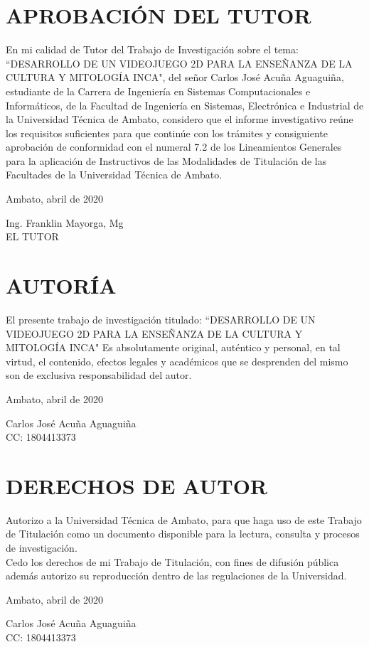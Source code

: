 \documentclass[a4paper, openright, 12pt]{report}
\begin{document}
\setcounter{page}{2}
\newpage
\chapter*{APROBACIÓN DEL TUTOR}
En mi calidad de Tutor del Trabajo de Investigación sobre el tema: ``DESARROLLO DE UN VIDEOJUEGO 2D PARA LA ENSEÑANZA DE LA CULTURA Y MITOLOGÍA INCA", del señor Carlos José Acuña Aguaguiña, estudiante de la Carrera de Ingeniería en Sistemas Computacionales e Informáticos, de la Facultad de Ingeniería en Sistemas, Electrónica e Industrial de la Universidad Técnica de Ambato, considero que el informe investigativo reúne los requisitos suficientes para que continúe con los trámites y consiguiente aprobación de conformidad con el numeral 7.2 de los Lineamientos Generales para la aplicación de Instructivos de las Modalidades de Titulación de las Facultades de la Universidad Técnica de Ambato.
\begin{flushright} 
Ambato, abril de 2020
\end{flushright}
\vfill
\begin{center}
Ing. Franklin Mayorga, Mg\\
EL TUTOR
\end{center}
\newpage
\chapter*{AUTORÍA}
El presente trabajo de investigación titulado: ``DESARROLLO DE UN VIDEOJUEGO 2D PARA LA ENSEÑANZA DE LA CULTURA Y MITOLOGÍA INCA" Es absolutamente original, auténtico y personal, en tal virtud, el contenido, efectos legales y académicos que se desprenden del mismo son de exclusiva responsabilidad del autor.
\begin{flushright} 
Ambato, abril de 2020
\end{flushright}
\vfill
\begin{center}
Carlos José Acuña Aguaguiña\\
CC: 1804413373
\end{center}
\newpage
\chapter*{DERECHOS DE AUTOR}
{}
Autorizo a la Universidad Técnica de Ambato, para que haga uso de este Trabajo de Titulación como un documento disponible para la lectura, consulta y procesos de investigación.\\
Cedo los derechos de mi Trabajo de Titulación, con fines de difusión pública además autorizo su reproducción dentro de las regulaciones de la Universidad.
\begin{flushright} 
Ambato, abril de 2020
\end{flushright}
\vfill
\begin{center}
Carlos José Acuña Aguaguiña\\
CC: 1804413373
\end{center}
\newpage
\end{document}
